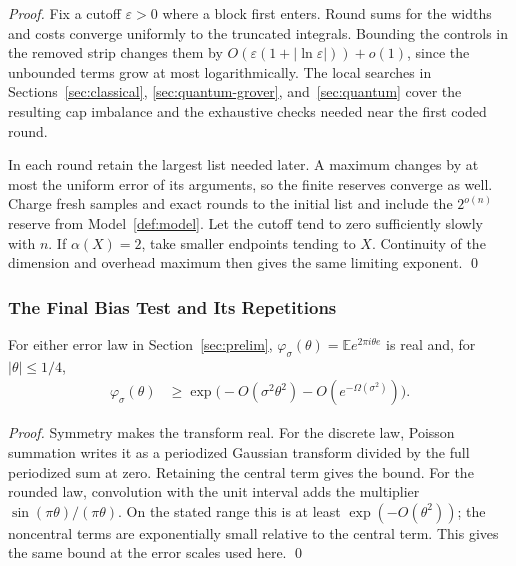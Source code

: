 \documentclass[runningheads,envcountsame,envcountsect,orivec]{llncs}
\newcommand{\E}{\mathbb E}
\begin{document}
\begin{proof}
Fix a cutoff $\varepsilon>0$ where a block first enters. Round sums
for the widths and costs converge uniformly to the
truncated integrals. Bounding the controls in the removed
strip changes them by
$O(\varepsilon(1+|\ln\varepsilon|))+o(1)$, since the
unbounded terms grow at most logarithmically. The local searches
in Sections~\ref{sec:classical}, \ref{sec:quantum-grover},
and~\ref{sec:quantum} cover the resulting cap imbalance and the exhaustive
checks needed near the first coded round.

In each round retain the largest list needed later.
A maximum changes by at most the uniform error of its
arguments, so the finite reserves converge as well.
Charge fresh samples and exact rounds to the initial list
and include the $2^{o(n)}$ reserve from Model~\ref{def:model}.
Let the cutoff tend to zero sufficiently slowly with $n$.
If $\alpha(X)=2$, take smaller endpoints tending to $X$.
Continuity of the dimension and overhead maximum then
gives the same limiting exponent.
\qed
\end{proof}

\subsubsection{The Final Bias Test and Its Repetitions}

\begin{lemma}
\label{lem:error-characteristic}
For either error law in Section~\ref{sec:prelim},
$\varphi_\sigma(\theta)=\E e^{2\pi i\theta e}$ is real and,
for $|\theta|\le1/4$,
\begin{align}
 \varphi_\sigma(\theta)
 &\ge\exp\bigl(-O(\sigma^2\theta^2)
                    -O(e^{-\Omega(\sigma^2)})\bigr).
 \label{eq:terminal-cf}
\end{align}
\end{lemma}

\begin{proof}
Symmetry makes the transform real. For the discrete law,
Poisson summation \cite[Appendix~A, Lemma~25]{DTV15}
writes it as a periodized Gaussian transform divided by
the full periodized sum at zero. Retaining the central
term gives the bound.
For the rounded law, convolution with the unit interval
adds the multiplier $\sin(\pi\theta)/(\pi\theta)$.
On the stated range this is at least
$\exp(-O(\theta^2))$; the noncentral terms are exponentially
small relative to the central term. This gives the same
bound at the error scales used here.
\qed
\end{proof}
\end{document}
